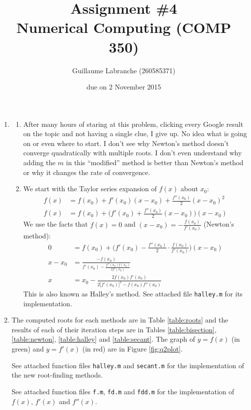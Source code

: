 \documentclass{article}
\author{Guillaume Labranche (260585371)}
\title{Assignment \#4\\Numerical Computing (COMP 350)}
\date{due on 2 November 2015}
\begin{document}
\maketitle
 
\begin{enumerate}
\item \begin{enumerate}
\item After many hours of staring at this problem, clicking every Google result on the topic and not having a single clue, I give up. No idea what is going on or even where to start. I don't see why Newton's method doesn't converge quadratically with multiple roots. I don't even understand why adding the $m$ in this ``modified'' method is better than Newton's method or why it changes the rate of convergence.
\item We start with the Taylor series expansion of $f(x)$ about $x_0$:
\begin{align*}
f(x) &= f(x_0) + f'(x_0)(x-x_0) + \frac{f''(x_0)}{2}(x-x_0)^2 \\
f(x) &= f(x_0) + \Big(f'(x_0) + \frac{f''(x_0)}{2}(x-x_0)\Big) (x-x_0)
\end{align*}
We use the facts that $f(x)=0$ and $(x-x_0)=-\frac{f(x_0)}{f'(x_0)}$ (Newton's method):
\begin{align*}
0 &= f(x_0) + \Big(f'(x_0) - \frac{f''(x_0)}{2} \cdot \frac{f(x_0)}{f'(x_0)} \Big) (x-x_0) \\
x-x_0 &= \frac{-f(x_0)}{f'(x_0) - \frac{f''(x_0) f(x_0)}{2 f'(x_0)}} \\
x &= x_0 - \frac{2f(x_0)f'(x_0)}{2\big[f'(x_0)\big]^2 - f(x_0) f''(x_0)} 
\end{align*}
This is also known as Halley's method. See attached file \texttt{halley.m} for its implementation.
\end{enumerate}
\item The computed roots for each methods are in Table \ref{table:roots} and the results of each of their iteration steps are in Tables \ref{table:bisection}, \ref{table:newton}, \ref{table:halley} and \ref{table:secant}. The graph of $y=f(x)$ (in green) and $y=f'(x)$ (in red) are in Figure \ref{fig:q2plot}.

See attached function files \texttt{halley.m} and \texttt{secant.m} for the implementation of the new root-finding methods.

See attached function files \texttt{f.m}, \texttt{fd.m} and \texttt{fdd.m} for the implementation of $f(x)$, $f'(x)$ and $f''(x)$.


\end{enumerate}
\end{document}
